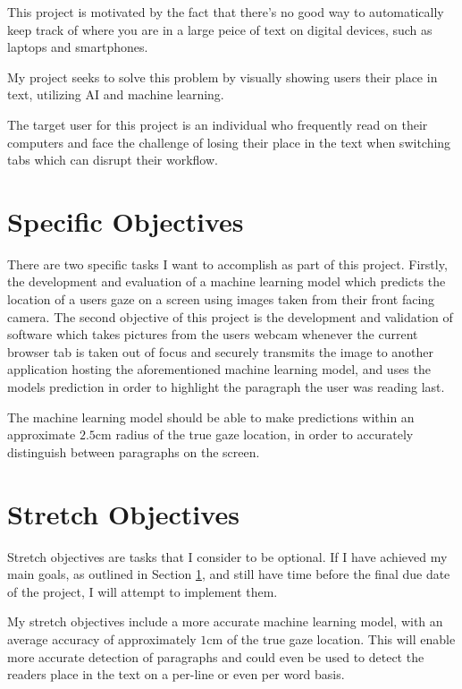 \documentclass[twocolumn]{report}
\begin{document}
This project is motivated by the fact that there's no good way to automatically keep track of where you are in a large peice of text on digital devices, such as laptops and smartphones. 

My project seeks to solve this problem by visually showing users their place in text, utilizing AI and machine learning. 

The target user for this project is an individual who frequently read on their computers and face the challenge of losing their place in the text when switching tabs which can disrupt their workflow. 

\section{Specific Objectives}\label{sec:specific-objectives}

There are two specific tasks I want to accomplish as part of this project. Firstly, the development and evaluation of a machine learning model which predicts the location of a users gaze on a screen using images taken from their front facing camera. The second objective of this project is the development and validation of software which takes pictures from the users webcam whenever the current browser tab is taken out of focus and securely transmits the image to another application hosting the aforementioned machine learning model, and uses the models prediction in order to highlight the paragraph the user was reading last. 

The machine learning model should be able to make predictions within an approximate $2.5\text{cm}$ radius of the true gaze location, in order to accurately distinguish between paragraphs on the screen. 
\section{Stretch Objectives}

Stretch objectives are tasks that I consider to be optional. If I have achieved my main goals, as outlined in Section \ref{sec:specific-objectives}, and still have time before the final due date of the project, I will attempt to implement them. 

My stretch objectives include a more accurate machine learning model, with an average accuracy of approximately $1\text{cm}$ of the true gaze location. This will enable more accurate detection of paragraphs and could even be used to detect the readers place in the text on a per-line or even per word basis. 
\end{document}
